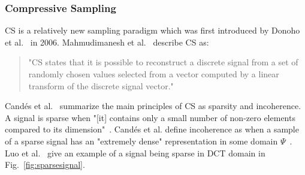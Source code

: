 

\subsubsection{Compressive Sampling}
\label{sec:Compressive Sampling}
\ac{CS} is a relatively new sampling paradigm which was first introduced by
Donoho et al.~\cite{Donoho06compressedsensing} in 2006. Mahmudimanesh et
al.~\cite{mahmudimanesh2010reordering} describe \ac{CS} as:

\begin{quotation}
    "\ac{CS} states that it is possible to reconstruct a discrete signal from a
    set of randomly chosen values selected from a vector computed by a linear
    transform of the discrete signal vector."
\end{quotation}

Candés et al.~\cite{candes2008introduction} summarize the main principles of
\ac{CS} as sparsity and incoherence. A signal is sparse when "[it] contains
only a small number of non-zero elements compared to its
dimension"~\cite{elzanati2015collaborative}. Candés et al. define incoherence
as when a sample of a sparse signal has an "extremely dense" representation in
some domain $ \Psi $~\cite{candes2008introduction}. Luo et
al.~\cite{luo2009compressive} give an example of a signal being sparse in
\ac{DCT} domain in Fig.~\ref{fig:sparsesignal}.

